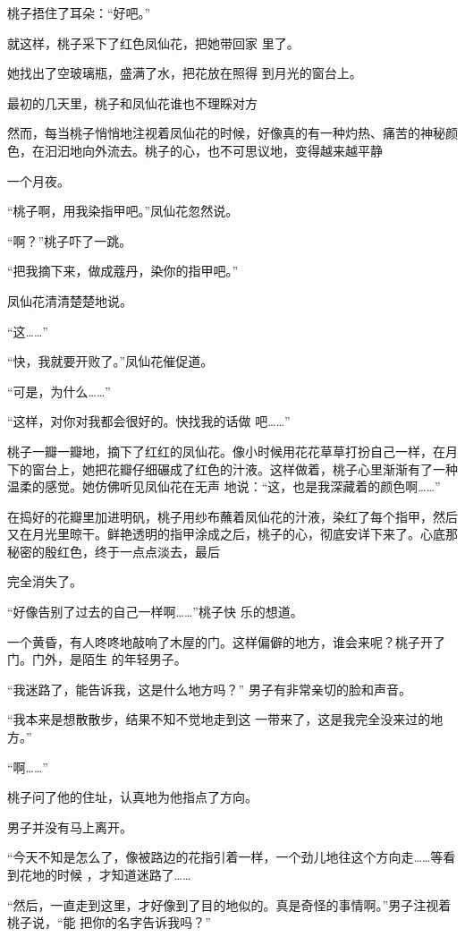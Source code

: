 \documentclass{article}
\begin{document}
\newpage


桃子捂住了耳朵：“好吧。” 

就这样，桃子采下了红色凤仙花，把她带回家
里了。 

她找出了空玻璃瓶，盛满了水，把花放在照得
到月光的窗台上。 

最初的几天里，桃子和凤仙花谁也不理睬对方

然而，每当桃子悄悄地注视着凤仙花的时候，好像真的有一种灼热、痛苦的神秘颜色，在汩汩地向外流去。桃子的心，也不可思议地，变得越来越平静


一个月夜。 

“桃子啊，用我染指甲吧。”凤仙花忽然说。


“啊？”桃子吓了一跳。 

“把我摘下来，做成蔻丹，染你的指甲吧。”
\newpage

凤仙花清清楚楚地说。 


“这……” 


“快，我就要开败了。”凤仙花催促道。 


“可是，为什么……” 

“这样，对你对我都会很好的。快找我的话做
吧……” 

桃子一瓣一瓣地，摘下了红红的凤仙花。像小时候用花花草草打扮自己一样，在月下的窗台上，她把花瓣仔细碾成了红色的汁液。这样做着，桃子心里渐渐有了一种温柔的感觉。她仿佛听见凤仙花在无声
地说：“这，也是我深藏着的颜色啊……” 

在捣好的花瓣里加进明矾，桃子用纱布蘸着凤仙花的汁液，染红了每个指甲，然后又在月光里晾干。鲜艳透明的指甲涂成之后，桃子的心，彻底安详下来了。心底那秘密的殷红色，终于一点点淡去，最后
\newpage

完全消失了。 

“好像告别了过去的自己一样啊……”桃子快
乐的想道。 

一个黄昏，有人咚咚地敲响了木屋的门。这样偏僻的地方，谁会来呢？桃子开了门。门外，是陌生
的年轻男子。 

“我迷路了，能告诉我，这是什么地方吗？”
男子有非常亲切的脸和声音。 

“我本来是想散散步，结果不知不觉地走到这
一带来了，这是我完全没来过的地方。” 


“啊……” 

桃子问了他的住址，认真地为他指点了方向。


男子并没有马上离开。 

\newpage

“今天不知是怎么了，像被路边的花指引着一样，一个劲儿地往这个方向走……等看到花地的时候
，才知道迷路了…… 

“然后，一直走到这里，才好像到了目的地似的。真是奇怪的事情啊。”男子注视着桃子说，“能
把你的名字告诉我吗？” 
\end{document}
